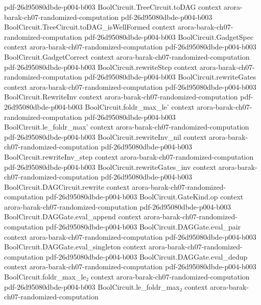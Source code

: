 \begin{theorem}
  {pdf-26d95080dbde-p004-b003}
\proofstep
  {BoolCircuit.TreeCircuit.toDAG}
  {context}
  {arora-barak-ch07-randomized-computation}
  {pdf-26d95080dbde-p004-b003}
\proofstep
  {BoolCircuit.TreeCircuit.toDAG_isWellFormed}
  {context}
  {arora-barak-ch07-randomized-computation}
  {pdf-26d95080dbde-p004-b003}
\proofstep
  {BoolCircuit.GadgetSpec}
  {context}
  {arora-barak-ch07-randomized-computation}
  {pdf-26d95080dbde-p004-b003}
\proofstep
  {BoolCircuit.GadgetCorrect}
  {context}
  {arora-barak-ch07-randomized-computation}
  {pdf-26d95080dbde-p004-b003}
\proofstep
  {BoolCircuit.rewriteStep}
  {context}
  {arora-barak-ch07-randomized-computation}
  {pdf-26d95080dbde-p004-b003}
\proofstep
  {BoolCircuit.rewriteGates}
  {context}
  {arora-barak-ch07-randomized-computation}
  {pdf-26d95080dbde-p004-b003}
\proofstep
  {BoolCircuit.RewriteInv}
  {context}
  {arora-barak-ch07-randomized-computation}
  {pdf-26d95080dbde-p004-b003}
\proofstep
  {BoolCircuit.foldr_max_le'}
  {context}
  {arora-barak-ch07-randomized-computation}
  {pdf-26d95080dbde-p004-b003}
\proofstep
  {BoolCircuit.le_foldr_max'}
  {context}
  {arora-barak-ch07-randomized-computation}
  {pdf-26d95080dbde-p004-b003}
\proofstep
  {BoolCircuit.rewriteInv_nil}
  {context}
  {arora-barak-ch07-randomized-computation}
  {pdf-26d95080dbde-p004-b003}
\proofstep
  {BoolCircuit.rewriteInv_step}
  {context}
  {arora-barak-ch07-randomized-computation}
  {pdf-26d95080dbde-p004-b003}
\proofstep
  {BoolCircuit.rewriteGates_inv}
  {context}
  {arora-barak-ch07-randomized-computation}
  {pdf-26d95080dbde-p004-b003}
\proofstep
  {BoolCircuit.DAGCircuit.rewrite}
  {context}
  {arora-barak-ch07-randomized-computation}
  {pdf-26d95080dbde-p004-b003}
\proofstep
  {BoolCircuit.GateKind.op}
  {context}
  {arora-barak-ch07-randomized-computation}
  {pdf-26d95080dbde-p004-b003}
\proofstep
  {BoolCircuit.DAGGate.eval_append}
  {context}
  {arora-barak-ch07-randomized-computation}
  {pdf-26d95080dbde-p004-b003}
\proofstep
  {BoolCircuit.DAGGate.eval_pair}
  {context}
  {arora-barak-ch07-randomized-computation}
  {pdf-26d95080dbde-p004-b003}
\proofstep
  {BoolCircuit.DAGGate.eval_singleton}
  {context}
  {arora-barak-ch07-randomized-computation}
  {pdf-26d95080dbde-p004-b003}
\proofstep
  {BoolCircuit.DAGGate.eval_dedup}
  {context}
  {arora-barak-ch07-randomized-computation}
  {pdf-26d95080dbde-p004-b003}
\proofstep
  {BoolCircuit.foldr_max_le₂}
  {context}
  {arora-barak-ch07-randomized-computation}
  {pdf-26d95080dbde-p004-b003}
\proofstep
  {BoolCircuit.le_foldr_max₂}
  {context}
  {arora-barak-ch07-randomized-computation}

\end{theorem}
